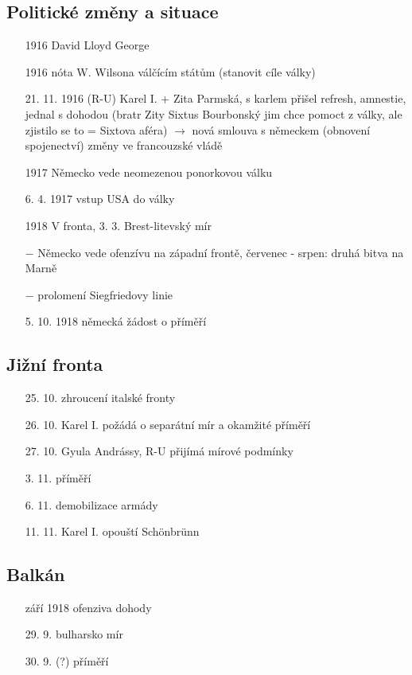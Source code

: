 \documentclass{article}
\begin{document}
\subsection*{Politické změny a situace}
\begin{itemize}
    \vspace{-0.5em}
    \setlength\itemsep{0.15em}
    \item[1916]   David Lloyd George
    \item[1916]  nóta W. Wilsona válčícím státům (stanovit cíle války)
    \item[21. 11. 1916]  (R-U) Karel I. + Zita Parmská, s karlem přišel refresh, amnestie, jednal s dohodou (bratr Zity Sixtus Bourbonský jim chce pomoct z války, ale zjistilo se to = Sixtova aféra) $\rightarrow$  nová smlouva s německem (obnovení spojenectví)
    změny ve francouzské vládě
    \item[1917] Německo vede neomezenou ponorkovou válku
    \item[6. 4. 1917] vstup USA do války
    \item[1918] V fronta, 3. 3. Brest-litevský mír
    \item[$-$] Německo vede ofenzívu na západní frontě,
    červenec - srpen: druhá bitva na Marně
    \item[$-$] prolomení Siegfriedovy linie
    \item[5. 10. 1918]  německá žádost o příměří
\end{itemize}

\subsection*{Jižní fronta}
\begin{itemize}
    \vspace{-0.5em}
    \setlength\itemsep{0.15em}
    \item[25. 10.]  zhroucení italské fronty
    \item[26. 10.]  Karel I. požádá o separátní mír a okamžité příměří
    \item[27. 10.]  Gyula Andrássy, R-U přijímá mírové podmínky
    \item[3. 11.]  příměří
    \item[6. 11.]  demobilizace armády
    \item[11. 11.]  Karel I. opouští Schönbrünn
\end{itemize}

\subsection*{Balkán}
\begin{itemize}
    \vspace{-0.5em}
    \setlength\itemsep{0.15em}
    \item[září 1918]  ofenziva dohody
    \item[29. 9.]  bulharsko mír
    \item[30. 9.]  (?) příměří
\end{itemize}
\end{document}
